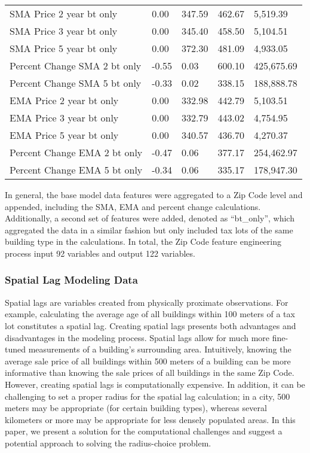 \documentclass[12pt,]{article}
\begin{document}
\begin{table}
{\begin{tabular}[t]{lllll}
\addlinespace
SMA Price 2 year bt only & 0.00 & 347.59 & 462.67 & 5,519.39\\
SMA Price 3 year bt only & 0.00 & 345.40 & 458.50 & 5,104.51\\
SMA Price 5 year bt only & 0.00 & 372.30 & 481.09 & 4,933.05\\
Percent Change SMA 2 bt only & -0.55 & 0.03 & 600.10 & 425,675.69\\
Percent Change SMA 5 bt only & -0.33 & 0.02 & 338.15 & 188,888.78\\
\addlinespace
EMA Price 2 year bt only & 0.00 & 332.98 & 442.79 & 5,103.51\\
EMA Price 3 year bt only & 0.00 & 332.79 & 443.02 & 4,754.95\\
EMA Price 5 year bt only & 0.00 & 340.57 & 436.70 & 4,270.37\\
Percent Change EMA 2 bt only & -0.47 & 0.06 & 377.17 & 254,462.97\\
Percent Change EMA 5 bt only & -0.34 & 0.06 & 335.17 & 178,947.30\\
\bottomrule
\end{tabular}}
\end{table}

In general, the base model data features were aggregated to a Zip Code
level and appended, including the SMA, EMA and percent change
calculations. Additionally, a second set of features were added, denoted
as ``bt\_only'', which aggregated the data in a similar fashion but only
included tax lots of the same building type in the calculations. In
total, the Zip Code feature engineering process input 92 variables and
output 122 variables.

\hypertarget{spatial-lag-modeling-data}{%
\subsubsection{Spatial Lag Modeling
Data}\label{spatial-lag-modeling-data}}

Spatial lags are variables created from physically proximate
observations. For example, calculating the average age of all buildings
within 100 meters of a tax lot constitutes a spatial lag. Creating
spatial lags presents both advantages and disadvantages in the modeling
process. Spatial lags allow for much more fine-tuned measurements of a
building's surrounding area. Intuitively, knowing the average sale price
of all buildings within 500 meters of a building can be more informative
than knowing the sale prices of all buildings in the same Zip Code.
However, creating spatial lags is computationally expensive. In
addition, it can be challenging to set a proper radius for the spatial
lag calculation; in a city, 500 meters may be appropriate (for certain
building types), whereas several kilometers or more may be appropriate
for less densely populated areas. In this paper, we present a solution
for the computational challenges and suggest a potential approach to
solving the radius-choice problem.
\end{document}
